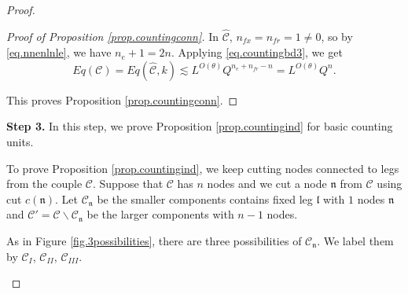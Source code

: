 \begin{proof}
\begin{proof}[Proof of Proposition \ref{prop.countingconn}]
In $\widehat{\mathcal{C}}$, $n_{\textit{fx}}=n_{\textit{fr}}=1\ne 0$, so by \eqref{eq.nnenlnle}, we have $n_e+1=2n$. Applying \eqref{eq.countingbd3}, we get
\begin{equation}\label{eq.stephatC'}
    Eq(\mathcal{C})=Eq(\widehat{\mathcal{C}},k)\lesssim L^{O(\theta)} Q^{n_e+n_{\textit{fr}}-n} = L^{O(\theta)} Q^{n}.
\end{equation}

This proves Proposition \ref{prop.countingconn}.
\end{proof}


\textbf{Step 3.} In this step, we prove Proposition \ref{prop.countingind} for basic counting units.

To prove Proposition \ref{prop.countingind}, we keep cutting nodes connected to legs from the couple $\mathcal{C}$. Suppose that $\mathcal{C}$ has $n$ nodes and we cut a node $\mathfrak{n}$ from $\mathcal{C}$ using cut $c(\mathfrak{n})$. Let $\mathcal{C}_{\mathfrak{n}}$ be the smaller components contains fixed leg $\mathfrak{l}$ with $1$ nodes $\mathfrak{n}$ and $\mathcal{C}' = \mathcal{C}\backslash \mathcal{C}_{\mathfrak{n}}$ be the larger components with $n-1$ nodes.

As in Figure \ref{fig.3possibilities}, there are three possibilities of $\mathcal{C}_{\mathfrak{n}}$. We label them by $\mathcal{C}_{I}$, $\mathcal{C}_{II}$, $\mathcal{C}_{III}$.


\begin{figure}[H]
    \centering
\end{figure}
\end{proof}
